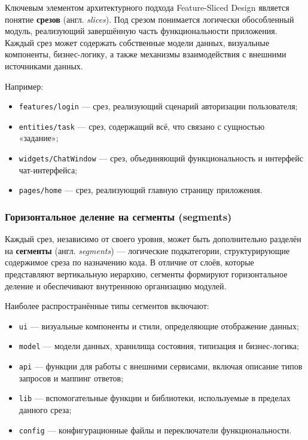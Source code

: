 Ключевым элементом архитектурного подхода Feature-Sliced Design является понятие \textbf{срезов} (англ. \textit{slices}). Под срезом понимается логически обособленный модуль, реализующий завершённую часть функциональности приложения. Каждый срез может содержать собственные модели данных, визуальные компоненты, бизнес-логику, а также механизмы взаимодействия с внешними источниками данных.

Например:
\begin{itemize}
  \item \texttt{features/login} — срез, реализующий сценарий авторизации пользователя;
  \item \texttt{entities/task} — срез, содержащий всё, что связано с сущностью «задание»;
  \item \texttt{widgets/ChatWindow} — срез, объединяющий функциональность и интерфейс чат-интерфейса;
  \item \texttt{pages/home} — срез, реализующий главную страницу приложения.
\end{itemize}

\subsubsection{Горизонтальное деление на сегменты (segments)}

Каждый срез, независимо от своего уровня, может быть дополнительно разделён на \textbf{сегменты} (англ. \textit{segments}) — логические подкатегории, структурирующие содержимое среза по назначению кода. В отличие от слоёв, которые представляют вертикальную иерархию, сегменты формируют горизонтальное деление и обеспечивают внутреннюю организацию модулей.

Наиболее распространённые типы сегментов включают:
\begin{itemize}
  \item \texttt{ui} — визуальные компоненты и стили, определяющие отображение данных;
  \item \texttt{model} — модели данных, хранилища состояния, типизация и бизнес-логика;
  \item \texttt{api} — функции для работы с внешними сервисами, включая описание типов запросов и маппинг ответов;
  \item \texttt{lib} — вспомогательные функции и библиотеки, используемые в пределах данного среза;
  \item \texttt{config} — конфигурационные файлы и переключатели функциональности.
\end{itemize}

